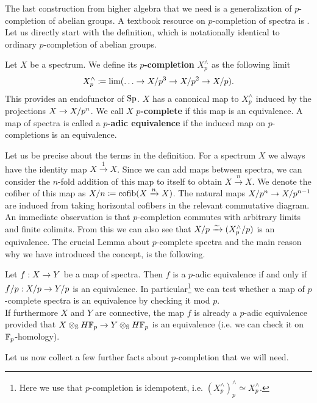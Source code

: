 The last construction from higher algebra that we need is a generalization of $p$-completion of abelian groups. A textbook resource on $p$-completion of spectra is \cite[Section~8.4.1]{barnesroitzheimfoundation}.
Let us directly start with the definition, which is notationally identical to ordinary $p$-completion of abelian groups.
\begin{defn}
    Let $X$ be a spectrum. We define its \textbf{$p$-completion} $X^\wedge_p$ as the following limit
    \begin{equation*}
        X^\wedge_p\coloneqq \lim (\dots\ra X/p^3\ra X/p^2\ra X/p).
    \end{equation*}
    This provides an endofunctor of $\operatorname{Sp}$.
    $X$ has a canonical map to $X^\wedge_p$ induced by the projections $X\rightarrow X/p^n$. We call $X$ \textbf{$p$-complete} if this map is an equivalence. A map of spectra is called a \textbf{$p$-adic equivalence} if the induced map on $p$-completions is an equivalence.  
\end{defn}
Let us be precise about the terms in the definition. For a spectrum $X$ we always have the identity map $X\xrightarrow{1}X$. Since we can add maps between spectra, we can consider the $n$-fold addition of this map to itself to obtain $X\xrightarrow{n}X$. We denote the cofiber of this map as $X/n\coloneqq \operatorname{cofib}(X\xrightarrow{n}X)$. The natural maps $X/p^n\rightarrow X/p^{n-1}$ are induced from taking horizontal cofibers in the relevant commutative diagram.
An immediate observation is that $p$-completion commutes with arbitrary limits and finite colimits. From this we can also see that $X/p\xrightarrow{\sim} (X_p^{\wedge}/p)$ is an equivalence. The crucial Lemma about $p$-complete spectra and the main reason why we have introduced the concept, is the following.
\begin{lem} \label{modpreduction}
    Let $f:X\rightarrow Y$ be a map of spectra. Then $f$ is a $p$-adic equivalence if and only if $f/p:X/p\rightarrow Y/p$ is an equivalence. In particular\footnote{Here we use that $p$-completion is idempotent, i.e. $(X^\wedge_p)^\wedge_p\simeq X^\wedge_p $.} we can test whether a map of $p$-complete spectra is an equivalence by checking it mod $p$. \\
    If furthermore $X$ and $Y$ are connective, the map $f$ is already a $p$-adic equivalence provided that $X\otimes_{\mathbb{S}} H\mathbb{F}_p\to Y\otimes_{\mathbb{S}} H\mathbb{F}_p$ is an equivalence (i.e. we can check it on $\mathbb{F}_p$-homology).
\end{lem}
Let us now collect a few further facts about $p$-completion that we will need.

